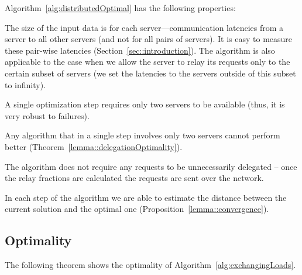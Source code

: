 \documentclass[11pt]{article}
\begin{document}
Algorithm~\ref{alg:distributedOptimal} has the following properties: 
\begin{inparaenum}[(i)] 
\item The size of the input data is  for each server---communication latencies from a server to all other servers (and not for all pairs of servers). It is easy to measure these pair-wise latencies (Section~\ref{sec::introduction}). The algorithm is also applicable to the case when we allow the server to relay its requests only to the certain subset of servers (we set the latencies to the servers outside of this subset to infinity).
\item A single optimization step requires only two servers to be available (thus, it is very robust to failures).
\item Any algorithm that in a single step involves only two servers cannot perform better (Theorem~\ref{lemma::delegationOptimality}).
\item The algorithm does not require any requests to be unnecessarily delegated -- once the relay fractions are calculated the requests are sent over the network.
\item In each step of the algorithm we are able to estimate the distance between the current solution and the optimal one (Proposition~\ref{lemma::convergence}).
\end{inparaenum}


\subsection{Optimality}

The following theorem shows the optimality of Algorithm~\ref{alg:exchangingLoads}.
\end{document}
